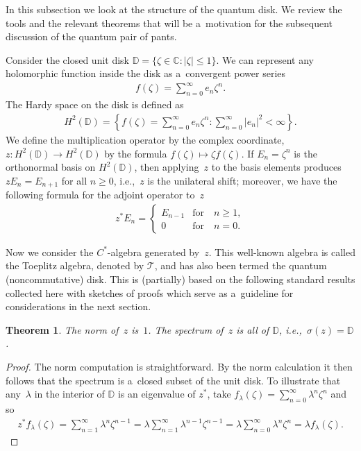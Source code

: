 \documentclass[pdftex]{sigma}
\numberwithin{equation}{section}
\newtheorem{Theorem}{Theorem}[section]
\begin{document}
In this subsection we look at the structure of the quantum disk.
We review the tools and the relevant theorems that will be a~motivation for the subsequent discussion of the quantum
pair of pants.

Consider the closed unit disk ${\mathbb D}=\{\zeta\in{\mathbb C}: |\zeta|\leq 1\}$.
We can represent any holomorphic function inside the disk as a~convergent power series
\begin{gather*}
f(\zeta)=\sum\limits_{n=0}^\infty e_n\zeta^n.
\end{gather*}
The Hardy space on the disk is def\/ined as
\begin{gather*}
H^2({\mathbb D})=\left\{f(\zeta)=\sum\limits_{n=0}^\infty e_n\zeta^n: \sum\limits_{n=0}^\infty|e_n|^2
<\infty\right\}.
\end{gather*}
We def\/ine the multiplication operator by the complex coordinate, $z:H^2({\mathbb D}) \to H^2({\mathbb D})$ by the
formula $f(\zeta)\mapsto \zeta f(\zeta)$.
If $E_n=\zeta^n$ is the orthonormal basis on $H^2({\mathbb D})$, then applying~$z$ to the basis elements produces
$zE_n=E_{n+1}$ for all $n \geq 0$, i.e.,~$z$ is the unilateral shift; moreover, we have the following formula for the adjoint operator to~$z$
\begin{gather*}
z^*E_n=
\begin{cases}
E_{n-1} &\text{for} \quad  n\ge 1,
\\
0  &\text{for} \quad n=0.
\end{cases}
\end{gather*}

Now we consider the $C^*$-algebra generated by~$z$.
This well-known algebra is called the Toeplitz algebra, denoted by $\mathcal{T}$, and has also been termed the quantum
(noncommutative) disk.
This is (partially) based on the following standard results collected here with sketches of proofs which serve as
a~guideline for considerations in the next section.

\begin{Theorem}
The norm of~$z$ is~$1$.
The spectrum of~$z$ is all of ${\mathbb D}$, i.e.,~$\sigma(z)={\mathbb D}$.
\end{Theorem}

\begin{proof}
The norm computation is straightforward.
By the norm calculation it then follows that the spectrum is a~closed subset of the unit disk.
To illustrate that any~$\lambda$ in the interior of ${\mathbb D}$ is an eigenvalue of $z^*$, take $f_\lambda(\zeta) =
\sum\limits_{n=0}^\infty \lambda^n \zeta^n$ and so
\begin{gather*}
z^*f_\lambda(\zeta)=\sum\limits_{n=1}^\infty \lambda^n \zeta^{n-1}=\lambda\sum\limits_{n=1}^\infty
\lambda^{n-1}\zeta^{n-1}=\lambda\sum\limits_{n=0}^\infty \lambda^n\zeta^n=\lambda f_\lambda(\zeta).\tag*{\qed}
\end{gather*}
\renewcommand{\qed}{}
\end{proof}
\end{document}
